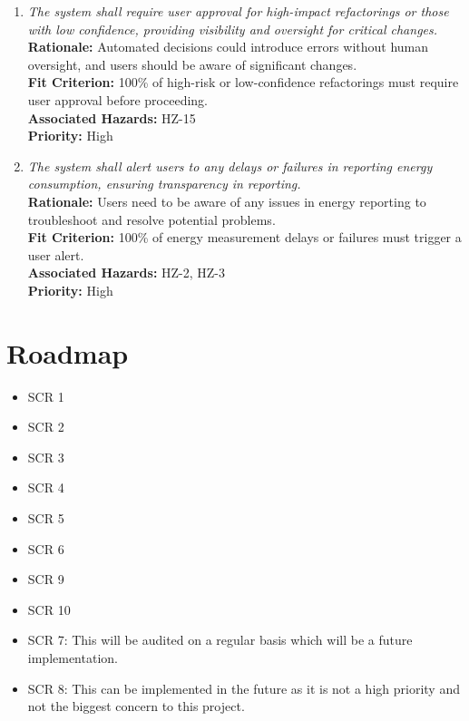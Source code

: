 \documentclass{article}
\begin{document}
\begin{enumerate}[label=SCR \arabic*., wide=0pt, leftmargin=*]
    \item \emph{The system shall require user approval for high-impact refactorings or those with low confidence, providing visibility and oversight for critical changes.}\\
    {\bf Rationale:} Automated decisions could introduce errors without human oversight, and users should be aware of significant changes.\\
    {\bf Fit Criterion:} 100\% of high-risk or low-confidence refactorings must require user approval before proceeding.\\
    {\bf Associated Hazards:} HZ-15\\
    {\bf Priority:} High

    \item \emph{The system shall alert users to any delays or failures in reporting energy consumption, ensuring transparency in reporting.}\\
    {\bf Rationale:} Users need to be aware of any issues in energy reporting to troubleshoot and resolve potential problems.\\
    {\bf Fit Criterion:} 100\% of energy measurement delays or failures must trigger a user alert.\\
    {\bf Associated Hazards:} HZ-2, HZ-3\\
    {\bf Priority:} High

\end{enumerate}

\section{Roadmap}

\begin{itemize}
    \item SCR 1
    \item SCR 2
    \item SCR 3
    \item SCR 4
    \item SCR 5
    \item SCR 6
    \item SCR 9
    \item SCR 10
\end{itemize}

\begin{itemize}
    \item SCR 7: This will be audited on a regular basis which will be a future implementation.
    \item SCR 8: This can be implemented in the future as it is not a high priority and not the biggest concern to this project.
\end{itemize}
\end{document}
